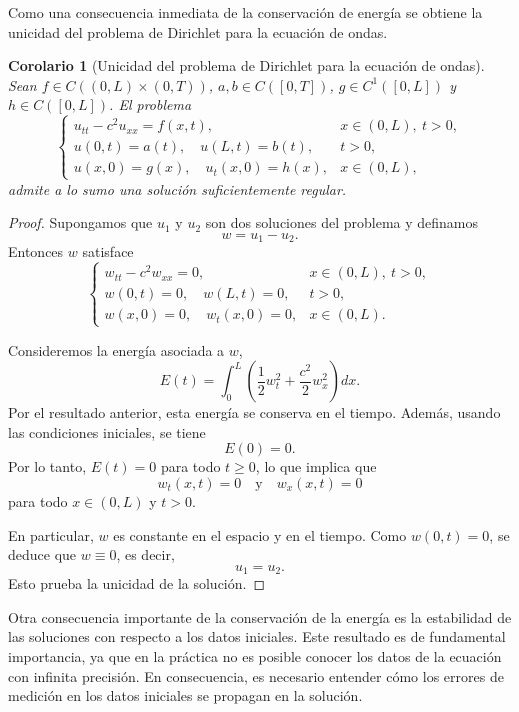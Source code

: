 \documentclass[12pt, a4paper]{amsbook}
\newtheorem{cor}[teo]{Corolario}
\theoremstyle{remark}
\theoremstyle{definition}
\numberwithin{section}{chapter}
\numberwithin{subsection}{section}
\numberwithin{equation}{section}
\numberwithin{figure}{chapter}
\begin{document}
Como una consecuencia inmediata de la conservación de energía se obtiene la unicidad del problema de Dirichlet para la ecuación de ondas.
\begin{cor}[Unicidad del problema de Dirichlet para la ecuación de ondas]
Sean $f \in C((0,L)\times(0,T))$, $a,b \in C([0,T])$, $g \in C^1([0,L])$ y $h \in C([0,L])$.
El problema
\[
\begin{cases}
u_{tt} - c^2 u_{xx} = f(x,t), & x\in(0,L),\ t>0,\\
u(0,t)=a(t),\quad u(L,t)=b(t), & t>0,\\
u(x,0)=g(x),\quad u_t(x,0)=h(x), & x\in(0,L),
\end{cases}
\]
admite a lo sumo una solución suficientemente regular.
\end{cor}

\begin{proof}
Supongamos que $u_1$ y $u_2$ son dos soluciones del problema y definamos
\[
w = u_1 - u_2.
\]
Entonces $w$ satisface
\[
\begin{cases}
w_{tt} - c^2 w_{xx} = 0, & x\in(0,L),\ t>0,\\
w(0,t)=0,\quad w(L,t)=0, & t>0,\\
w(x,0)=0,\quad w_t(x,0)=0, & x\in(0,L).
\end{cases}
\]

Consideremos la energía asociada a $w$,
\[
E(t) = \int_0^L \left( \frac12 w_t^2 + \frac{c^2}{2} w_x^2 \right) dx.
\]
Por el resultado anterior, esta energía se conserva en el tiempo. Además, usando las condiciones iniciales, se tiene
\[
E(0) = 0.
\]
Por lo tanto, $E(t)=0$ para todo $t\ge 0$, lo que implica que
\[
w_t(x,t)=0 \quad \text{y} \quad w_x(x,t)=0
\]
para todo $x\in(0,L)$ y $t>0$.

En particular, $w$ es constante en el espacio y en el tiempo. Como $w(0,t)=0$, se deduce que $w\equiv 0$, es decir,
\[
u_1 = u_2.
\]
Esto prueba la unicidad de la solución.
\end{proof}

Otra consecuencia importante de la conservación de la energía es la estabilidad de las soluciones con respecto a los datos iniciales. Este resultado es de fundamental importancia, ya que en la práctica no es posible conocer los datos de la ecuación con infinita precisión. En consecuencia, es necesario entender cómo los errores de medición en los datos iniciales se propagan en la solución.
 
\end{document}
